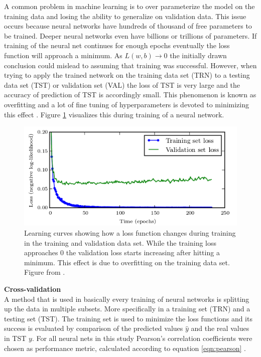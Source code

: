 A common problem in machine learning is to over parameterize the model on the training data
and losing the ability to generalize on validation data. This issue occurs because neural
networks have hundreds of thousand of free parameters to be trained. Deeper neural
networks even have billions or trillions of parameters. If training of the neural net
continues for enough epochs eventually the loss function will approach a minimum. As
$ L(w,b) \rightarrow 0 $ the initially drawn conclusion could mislead to assuming that
training was successful. However, when trying to apply the trained network on the training
data set (TRN) to a testing data set (TST) or validation set (VAL) the loss of TST is very large and the accuracy
of prediction of TST is accordingly small. This phenomenon is known as overfitting and a
lot of fine tuning of hyperparameters is devoted to minimizing this effect
\cite{tetko1995neural}. Figure \ref{fig:overfitting} visualizes this  during
training \cite{goodfellow2016deep} of a neural network.

\begin{figure}[H]
  \centering \includegraphics[height=.35\textheight, width=1.0\textwidth]{Figures/overfitting}
  \decoRule
  \caption[Training vs. validation loss over time]{Learning curves showing how a loss function
    changes during training in the training and validation data set. While the training loss
    approaches 0 the validation loss starts increasing after hitting a minimum. This effect is due
    to overfitting on the training data set. Figure from \cite{goodfellow2016deep}.}
 \label{fig:overfitting}
\end{figure}

\textbf{Cross-validation} \\

A method that is used in basically every training of neural networks is splitting up the
data in multiple subsets. More specifically in a training set (TRN) and a testing set
(TST). The training set is used to minimize the loss functions and its success is
evaluated by comparison of the predicted values $\hat{y}$ and the real
values in TST $y$. For all neural nets in this study Pearson's correlation coefficients
were chosen as performance metric, calculated according to equation \ref{eqn:pearson}
\cite{soper1917distribution}.

